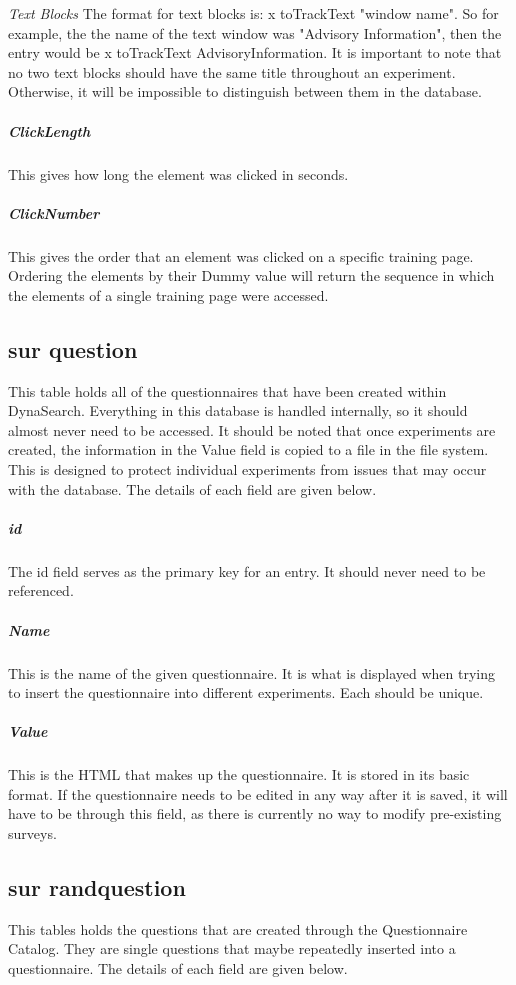 \documentclass[article]{ij4uq}              %
\begin{document}
\emph{Text Blocks}
The format for text blocks is: x toTrackText "window name". So for example, the the name of the text window was "Advisory Information", then the entry would be x toTrackText AdvisoryInformation. 
It is important to note that no two text blocks should have the same title throughout an experiment. Otherwise, it will be impossible to distinguish between them in the database.

\subparagraph{ClickLength}
This gives how long the element was clicked in seconds.

\subparagraph{ClickNumber}
This gives the order that an element was clicked on a specific training page. Ordering the elements by their Dummy value will return the sequence in which the elements of a single training page were accessed.

\subsection{sur question}
This table holds all of the questionnaires that have been created within DynaSearch. Everything in this database is handled internally, so it should almost never need to be accessed. It should be noted that once experiments are created, the information in the Value field is copied to a file in the file system. This is designed to protect individual experiments from issues that may occur with the database. The details of each field are given below.

\subparagraph{id}
The id field serves as the primary key for an entry. It should never need to be referenced. 

\subparagraph{Name}
This is the name of the given questionnaire. It is what is displayed when trying to insert the questionnaire into different experiments. Each should be unique. 

\subparagraph{Value}
This is the HTML that makes up the questionnaire. It is stored in its basic format. If the questionnaire needs to be edited in any way after it is saved, it will have to be through this field, as there is currently no way to modify pre-existing surveys. 

\subsection{sur randquestion}
This tables holds the questions that are created through the Questionnaire Catalog. They are single questions that maybe repeatedly inserted into a questionnaire. The details of each field are given below. 
\end{document}
